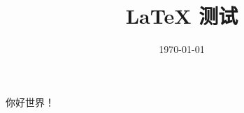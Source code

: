 \documentclass{ctexart}
\title{LaTeX 测试}
\date{\today}
\author{}
\begin{document}
\maketitle

你好世界！
\end{document}
